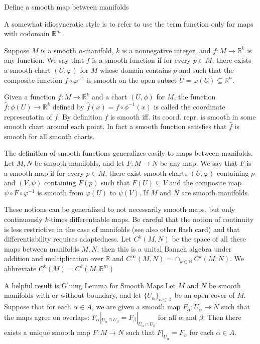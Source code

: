 Define a smooth map between manifolds

A somewhat idiosyncratic style is to refer to use the term function only for maps with codomain \( \mathbb{R}^m \).

Suppose \(M\) is a smooth \(n\)-manifold, \(k\) is a nonnegative integer, and \(f : M \rightarrow \mathbb{R}^k\) is any function. We say that \(f\) is a smooth function
if for every \(p \in M\), there exists a smooth chart \((U, \varphi)\) for \(M\) whose domain contains \(p\) and 
such that the composite function \(f \circ \varphi^{-1}\) is smooth on the open subset \(\hat{U} = \varphi(U) \subseteq \mathbb{R}^n\).

Given a function \( f : M \to \mathbb{R}^k \) and a chart \( (U, \phi) \) for \( M \), the function \( \hat{f}: \phi(U) \to \mathbb{R}^k \)
defined by \( \hat{f}(x) = f \circ \phi^{-1}(x) \) is called the coordinate representatin of \( f \). By definition \( f \) is smooth iff.
its coord. repr. is smooth in some smooth chart around each point. In fact a smooth function satisfies that \( \hat{f} \) is smooth for all smooth charts.

The definition of smooth functions generalizes easily to maps between manifolds.
Let \(M, N\) be smooth manifolds, and let \(F : M \rightarrow N\) be any map. We say that \(F\) is a smooth map if for every \(p \in M\), there exist smooth charts \((U, \varphi)\) containing \(p\) and 
\((V, \psi)\) containing \(F(p)\) such that \(F(U) \subseteq V\) and the composite map \(\psi \circ F \circ \varphi^{-1}\) is smooth from \(\varphi(U)\) to \(\psi(V)\). If \(M\) and \(N\) are smooth manifolds.

These notions can be generalized to not necessarily smooth maps, but only continuously \( k \)-times differentiable maps.
Be careful that the notion of continuity is less restrictive in the case of manifolds (see also other flash card) and that differentiability requires adaptedness.
Let \( C^k(M, N) \) be the space of all these maps between manifolds \( M, N \), then this is a unital Banach algebra under addition and
multiplication over \( \mathbb{R} \) and \( C^{\infty}(M, N) = \cap_{k \in \mathbb{N}} C^{k}(M, N) \). We abbreviate \( C^{k}(M) = C^{k}(M, \mathbb{R}^m) \)

A helpful result is
Gluing Lemma for Smooth Maps
Let \(M\) and \(N\) be smooth manifolds with or without boundary, and let \(\{U_\alpha\}_{\alpha \in A}\) be an open cover of \(M\). Suppose that for each \(\alpha \in A\), we are given a smooth map \(F_\alpha : U_\alpha \to N\) such that the maps agree on overlaps: \(F_\alpha |_{U_\alpha \cap U_\beta} = F_\beta |_{U_\alpha \cap U_\beta}\) for all \(\alpha\) and \(\beta\). Then there exists a unique smooth map \(F : M \to N\) such that \(F|_{U_\alpha} = F_\alpha\) for each \(\alpha \in A\).


